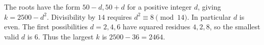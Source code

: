 The roots have the form $50-d,50+d$ for a positive integer $d$, giving $k=2500-d^2$. Divisibility by $14$ requires $d^2\equiv8\pmod{14}$. In particular $d$ is even. The first possibilities $d=2,4,6$ have squared residues $4,2,8$, so the smallest valid $d$ is $6$. Thus the largest $k$ is $2500-36=\boxed{2464}$.

